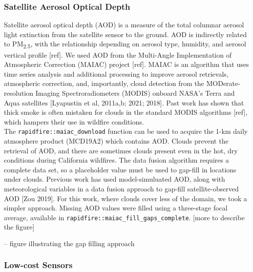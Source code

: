 \documentclass[gmd, manuscript]{copernicus}
\begin{document}
\subsubsection{Satellite Aerosol Optical Depth}

Satellite aerosol optical depth (AOD) is a measure of the total columnar
aerosol light extinction from the satellite sensor to the ground. AOD is
indirectly related to PM\textsubscript{2.5}, with the relationship
depending on aerosol type, humidity, and aerosol vertical profile
{[}ref{]}. We used AOD from the Multi-Angle Implementation of
Atmospheric Correction (MAIAC) project {[}ref{]}. MAIAC is an algorithm
that uses time series analysis and additional processing to improve
aerosol retrievals, atmospheric correction, and, importantly, cloud
detection from the MODerate-resolution Imaging Spectroradiometers
(MODIS) onboard NASA's Terra and Aqua satellites {[}Lyapustin et al,
2011a,b; 2021; 2018{]}. Past work has shown that thick smoke is often
mistaken for clouds in the standard MODIS algorithms {[}ref{]}, which
hampers their use in wildfire conditions.\\
The \texttt{rapidfire::maiac\_download} function can be used to acquire
the 1-km daily atmosphere product (MCD19A2) which contains AOD. Clouds
prevent the retrieval of AOD, and there are sometimes clouds present
even in the hot, dry conditions during California wildfires. The data
fusion algorithm requires a complete data set, so a placeholder value
must be used to gap-fill in locations under clouds. Previous work has
used model-simuluated AOD, along with meteorological variables in a data
fusion approach to gap-fill satellite-observed AOD {[}Zou 2019{]}. For
this work, where clouds cover less of the domain, we took a simpler
approach. Missing AOD values were filled using a three-stage focal
average, available in \texttt{rapidfire::maiac\_fill\_gaps\_complete}.
{[}more to describe the figure{]}

-- figure illustrating the gap filling approach

\subsubsection{Low-cost Sensors}
\end{document}
